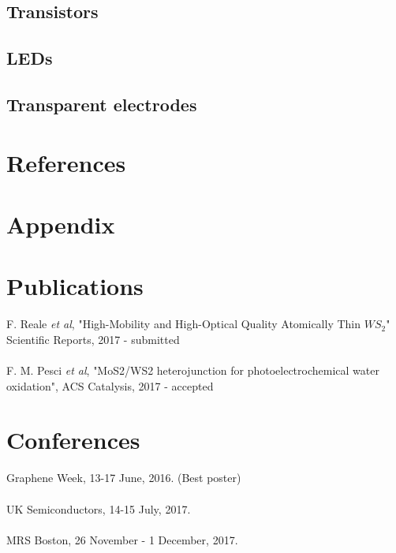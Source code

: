 \documentclass[12pt]{article}
\begin{document}
	\subsection{Transistors}
	\subsection{LEDs}
	\subsection{Transparent electrodes}
	
\section*{References}
\section*{Appendix}

\section*{Publications}

F. Reale \textit{et al}, "High-Mobility and High-Optical Quality Atomically Thin $WS_2$" Scientific Reports, 2017 - submitted\\ \\
F. M. Pesci \textit{et al}, "MoS2/WS2 heterojunction for photoelectrochemical water oxidation", ACS Catalysis, 2017 - accepted

\section*{Conferences}

Graphene Week, 13-17 June, 2016. (Best poster)\\ \\
UK Semiconductors, 14-15 July, 2017.\\ \\
MRS Boston, 26 November - 1 December, 2017.


{}
\end{document}

